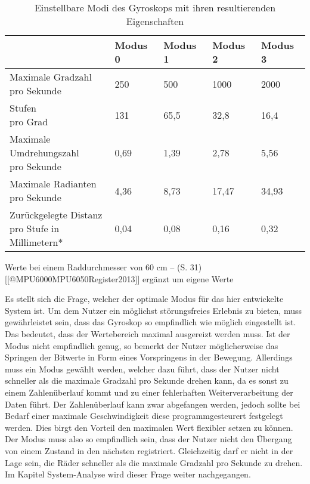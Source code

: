 \begin{table}[h]
    \centering
    \begin{threeparttable}
        \caption{Einstellbare Modi des Gyroskops mit ihren resultierenden Eigenschaften}
        \begin{tabular}{|l|l|l|l|l|}
            \hline
            ~ & Modus 0 & Modus 1 & Modus 2 & Modus 3  \\ \hline
            \parbox[c][1cm]{4cm}{Maximale Gradzahl     \\pro Sekunde}                   & 250     & 500     & 1000    & 2000    \\ \hline
            \parbox[c][1cm]{4cm}{Stufen                \\pro Grad }                                & 131     & 65,5    & 32,8    & 16,4    \\ \hline
            \parbox[c][1.5cm]{4cm}{Maximale            \\Umdrehungszahl \\pro Sekunde   }          & 0,69    & 1,39    & 2,78    & 5,56    \\ \hline
            \parbox[c][1cm]{4cm}{Maximale Radianten    \\pro Sekunde       }           & 4,36    & 8,73    & 17,47   & 34,93   \\ \hline
            \parbox[c][1cm]{4cm}{Zurückgelegte Distanz \\pro Stufe in Millimetern*} & 0,04    & 0,08    & 0,16    & 0,32    \\ \hline
        \end{tabular}
        \begin{tablenotes}
            \small
            \item Werte bei einem Raddurchmesser von 60 cm – (S. 31) [[@MPU6000MPU6050Register2013]] ergänzt um eigene Werte
        \end{tablenotes}
    \end{threeparttable}
\end{table}

Es stellt sich die Frage, welcher der optimale Modus für das hier entwickelte System ist.
Um dem Nutzer ein möglichst störungsfreies Erlebnis zu bieten, muss gewährleistet sein, dass das Gyroskop so empfindlich wie möglich eingestellt ist.
Das bedeutet, dass der Wertebereich maximal ausgereizt werden muss.
Ist der Modus nicht empfindlich genug, so bemerkt der Nutzer möglicherweise das Springen der Bitwerte in Form eines Vorspringens in der Bewegung.
Allerdings muss ein Modus gewählt werden, welcher dazu führt, dass der Nutzer nicht schneller als die maximale Gradzahl pro Sekunde drehen kann, da es sonst zu einem Zahlenüberlauf kommt und zu einer fehlerhaften Weiterverarbeitung der Daten führt.
Der Zahlenüberlauf kann zwar abgefangen werden, jedoch sollte bei Bedarf einer maximale Geschwindigkeit diese programmgesteurert festgelegt werden.
Dies birgt den Vorteil den maximalen Wert flexibler setzen zu können.
Der Modus muss also so empfindlich sein, dass der Nutzer nicht den Übergang von einem Zustand in den nächsten registriert.
Gleichzeitig darf er nicht in der Lage sein, die Räder schneller als die maximale Gradzahl pro Sekunde zu drehen.
Im Kapitel System-Analyse wird dieser Frage weiter nachgegangen.


